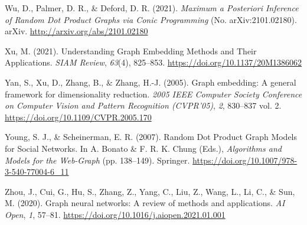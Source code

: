 \documentclass[11pt]{article}
\newlength{\cslhangindent}
\newenvironment{CSLReferences}[2] %
 {%
  \setlength{\parindent}{0pt}
  \ifodd #1 \everypar{\setlength{\hangindent}{\cslhangindent}}\ignorespaces\fi
  \ifnum #2 > 0
  \setlength{\parskip}{#2\baselineskip}
  \fi
 }%
 {}
\begin{document}
\begin{CSLReferences}{1}{0}
\leavevmode{}%
Wu, D., Palmer, D. R., \& Deford, D. R. (2021). \emph{Maximum a
Posteriori Inference of Random Dot Product Graphs via Conic Programming}
(No. arXiv:2101.02180). arXiv. \url{http://arxiv.org/abs/2101.02180}

\leavevmode{}%
Xu, M. (2021). Understanding Graph Embedding Methods and Their
Applications. \emph{SIAM Review}, \emph{63}(4), 825--853.
\url{https://doi.org/10.1137/20M1386062}

\leavevmode{}%
Yan, S., Xu, D., Zhang, B., \& Zhang, H.-J. (2005). Graph embedding: A
general framework for dimensionality reduction. \emph{2005 IEEE Computer
Society Conference on Computer Vision and Pattern Recognition
(CVPR'05)}, \emph{2}, 830--837 vol. 2.
\url{https://doi.org/10.1109/CVPR.2005.170}

\leavevmode{}%
Young, S. J., \& Scheinerman, E. R. (2007). Random Dot Product Graph
Models for Social Networks. In A. Bonato \& F. R. K. Chung (Eds.),
\emph{Algorithms and Models for the Web-Graph} (pp. 138--149). Springer.
\url{https://doi.org/10.1007/978-3-540-77004-6_11}

\leavevmode{}%
Zhou, J., Cui, G., Hu, S., Zhang, Z., Yang, C., Liu, Z., Wang, L., Li,
C., \& Sun, M. (2020). Graph neural networks: A review of methods and
applications. \emph{AI Open}, \emph{1}, 57--81.
\url{https://doi.org/10.1016/j.aiopen.2021.01.001}

\end{CSLReferences}
\end{document}

